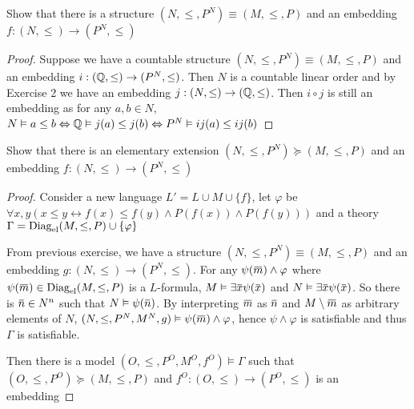 \documentclass[11pt]{article}
\begin{document}
\begin{exercise}
Show that there is a structure \((N,\le,P^N)\equiv(M,\le,P)\) and an embedding \(f:(N,\le)\to(P^N,\le)\)
\end{exercise}

\begin{proof}
Suppose we have a countable structure \((N,\le,P^N)\equiv(M,\le,P)\) and an embedding \(i:(\mathbb{Q},\le)\to(P^N,\le)\). Then
\(N\) is a countable linear order and by Exercise 2 we have an embedding \(j:(N,\le)\to(\mathbb{Q},\le)\).
Then \(i\circ j\) is still an embedding as for any \(a,b\in N\), \(N\vDash a\le b\Leftrightarrow\mathbb{Q}\vDash j(a)\le j(b)\Leftrightarrow P^N\vDash ij(a)\le ij(b)\)
\end{proof}

\begin{exercise}
Show that there is an elementary extension \((N,\le,P^N)\succeq(M,\le,P)\) and an embedding \(f:(N,\le)\to(P^N,\le)\)
\end{exercise}

\begin{proof}
Consider a new language \(L'=L\cup M\cup\{f\}\), let
\(\varphi\) be \(\forall x,y(x\le y\leftrightarrow f(x)\le f(y)\wedge P(f(x))\wedge P(f(y)))\)
and a theory
\(\Gamma =\operatorname{Diag}_{\operatorname{el}}(M,\le,P)\cup\{\varphi\}\)

From previous exercise, we have a structure \((N,\le,P^N)\equiv(M,\le,P)\) and an embedding \(g:(N,\le)\to(P^N,\le)\).
For any \(\psi(\barm)\wedge\varphi\) where \(\psi(\barm)\in\Diag_{\el}(M,\le,P)\) is a \(L\)-formula, \(M\vDash\exists\barx\psi(\barx)\)
and \(N\vDash\exists\barx\psi(\barx)\). So there is \(\barn\in N^n\) such that \(N\vDash\psi(\barn)\). By
interpreting \(\barm\) as \(\barn\) and \(M\setminus\barm\) as arbitrary elements
of \(N\), \((N,\le,P^N,M^N,g)\vDash\psi(\barm)\wedge\varphi\), hence \(\psi\wedge\varphi\) is satisfiable and thus \(\Gamma\) is satisfiable.

Then there is a model \((O,\le,P^O,M^O,f^O)\vDash\Gamma\) such that \((O,\le,P^O)\succeq(M,\le,P)\) and \(f^O:(O,\le)\to(P^O,\le)\) is
an embedding
\end{proof}
\end{document}
